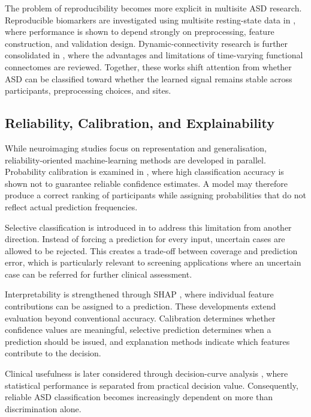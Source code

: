 \documentclass[a4paper,fleqn]{cas-sc}
\begin{document}
The problem of reproducibility becomes more explicit in multisite ASD research. Reproducible biomarkers are investigated using multisite resting-state data in \cite{Abrahametal2017}, where performance is shown to depend strongly on preprocessing, feature construction, and validation design. Dynamic-connectivity research is further consolidated in \cite{Pretietal2017}, where the advantages and limitations of time-varying functional connectomes are reviewed. Together, these works shift attention from whether ASD can be classified toward whether the learned signal remains stable across participants, preprocessing choices, and sites.

\subsection{Reliability, Calibration, and Explainability}

While neuroimaging studies focus on representation and generalisation, reliability-oriented machine-learning methods are developed in parallel. Probability calibration is examined in \cite{Guoetal2017}, where high classification accuracy is shown not to guarantee reliable confidence estimates. A model may therefore produce a correct ranking of participants while assigning probabilities that do not reflect actual prediction frequencies.

Selective classification is introduced in \cite{GeifmanElYaniv2017} to address this limitation from another direction. Instead of forcing a prediction for every input, uncertain cases are allowed to be rejected. This creates a trade-off between coverage and prediction error, which is particularly relevant to screening applications where an uncertain case can be referred for further clinical assessment.

Interpretability is strengthened through SHAP \cite{LundbergLee2017}, where individual feature contributions can be assigned to a prediction. These developments extend evaluation beyond conventional accuracy. Calibration determines whether confidence values are meaningful, selective prediction determines when a prediction should be issued, and explanation methods indicate which features contribute to the decision.

Clinical usefulness is later considered through decision-curve analysis \cite{VanCalsteretal2018}, where statistical performance is separated from practical decision value. Consequently, reliable ASD classification becomes increasingly dependent on more than discrimination alone.
\end{document}
